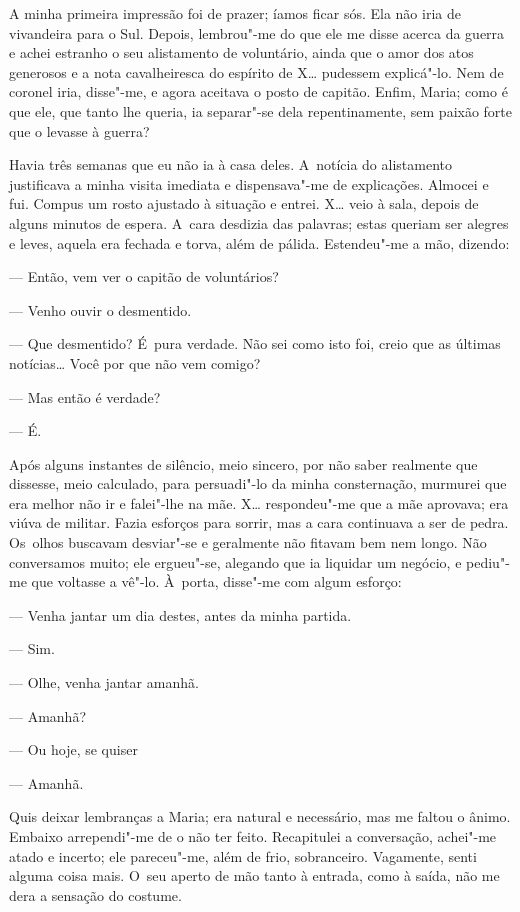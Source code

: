 \begin{linenumbers}
A minha primeira impressão foi de prazer; íamos ficar sós. Ela não iria
de vivandeira para o Sul. Depois, lembrou"-me do que ele me disse acerca
da guerra e achei estranho o seu alistamento de voluntário, ainda que o
amor dos atos generosos e a nota cavalheiresca do espírito de X\ldots{}
pudessem explicá"-lo. Nem de coronel iria, disse"-me, e agora aceitava o
posto de capitão. Enfim, Maria; como é que ele, que tanto lhe queria, ia
separar"-se dela repentinamente, sem paixão forte que o levasse à guerra?

Havia três semanas que eu não ia à casa deles. A~notícia do alistamento
justificava a minha visita imediata e dispensava"-me de explicações.
Almocei e fui. Compus um rosto ajustado à situação e entrei. X\ldots{} veio à
sala, depois de alguns minutos de espera. A~cara desdizia das palavras;
estas queriam ser alegres e leves, aquela era fechada e torva, além de
pálida. Estendeu"-me a mão, dizendo:

--- Então, vem ver o capitão de voluntários?

--- Venho ouvir o desmentido.

--- Que desmentido? É~pura verdade. Não sei como isto foi, creio que as
últimas notícias\ldots{} Você por que não vem comigo?

--- Mas então é verdade?

--- É.

Após alguns instantes de silêncio, meio sincero, por não saber realmente
que dissesse, meio calculado, para persuadi"-lo da minha consternação,
murmurei que era melhor não ir e falei"-lhe na mãe. X\ldots{} respondeu"-me que
a mãe aprovava; era viúva de militar. Fazia esforços para sorrir, mas a
cara continuava a ser de pedra. Os~olhos buscavam desviar"-se e
geralmente não fitavam bem nem longo. Não conversamos muito; ele
ergueu"-se, alegando que ia liquidar um negócio, e pediu"-me que voltasse
a vê"-lo. À~porta, disse"-me com algum esforço:

--- Venha jantar um dia destes, antes da minha partida.

--- Sim.

--- Olhe, venha jantar amanhã.

--- Amanhã?

--- Ou hoje, se quiser

--- Amanhã.

Quis deixar lembranças a Maria; era natural e necessário, mas me faltou
o ânimo. Embaixo arrependi"-me de o não ter feito. Recapitulei a
conversação, achei"-me atado e incerto; ele pareceu"-me, além de frio,
sobranceiro. Vagamente, senti alguma coisa mais. O~seu aperto de mão
tanto à entrada, como à saída, não me dera a sensação do costume.


\end{linenumbers}
